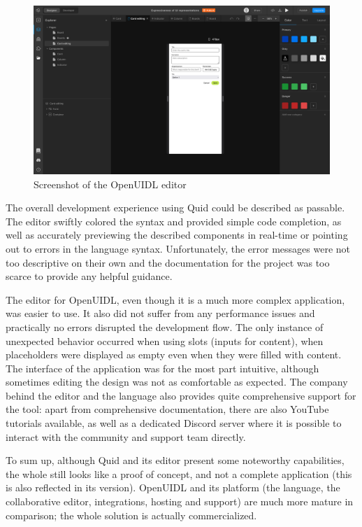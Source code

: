 \begin{figure}
    \centering
    \includegraphics[width=\textwidth]{4-results-and-discussion/openuidl-editor}
    \caption{Screenshot of the OpenUIDL editor}
    \label{fig:4-2-openuidl-editor}
\end{figure}

The overall development experience using Quid could be described as passable.
The editor swiftly colored the syntax and provided simple code completion, as well as accurately previewing the described components in real-time or pointing out to errors in the language syntax.
Unfortunately, the error messages were not too descriptive on their own and the documentation for the project was too scarce to provide any helpful guidance.

The editor for OpenUIDL, even though it is a much more complex application, was easier to use.
It also did not suffer from any performance issues and practically no errors disrupted the development flow.
The only instance of unexpected behavior occurred when using slots (inputs for content), when placeholders were displayed as empty even when they were filled with content.
The interface of the application was for the most part intuitive, although sometimes editing the design was not as comfortable as expected.
The company behind the editor and the language also provides quite comprehensive support for the tool: apart from comprehensive documentation, there are also YouTube tutorials available, as well as a dedicated Discord server where it is possible to interact with the community and support team directly.

To sum up, although Quid and its editor present some noteworthy capabilities, the whole still looks like a proof of concept, and not a complete application (this is also reflected in its version).
OpenUIDL and its platform (the language, the collaborative editor, integrations, hosting and support) are much more mature in comparison; the whole solution is actually commercialized.
